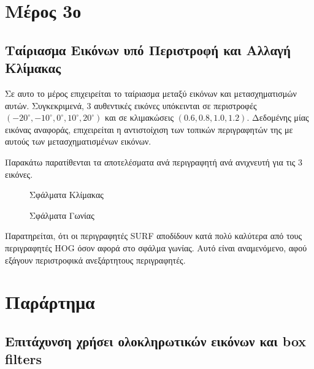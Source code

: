 \documentclass{article}
\newcommand{\eng}[1]{\foreignlanguage{english}{#1}}
\begin{document}
\section{Μέρος 3ο}

\subsection{Ταίριασμα Εικόνων υπό Περιστροφή και Αλλαγή Κλίμακας}

Σε αυτο το μέρος επιχειρείται το ταίριασμα μεταξύ εικόνων και μετασχηματισμών αυτών. Συγκεκριμενά, 3 αυθεντικές εικόνες υπόκεινται σε περιστροφές $(-20^{\circ}, -10^{\circ}, 0^{\circ}, 10^{\circ}, 20^{\circ})$ και σε κλιμακώσεις  $(0.6, 0.8, 1.0, 1.2)$. Δεδομένης μίας εικόνας αναφοράς, επιχειρείται η αντιστοίχιση των τοπικών περιγραφητών της με αυτούς των μετασχηματισμένων εικόνων.

Παρακάτω παρατίθενται τα αποτελέσματα ανά περιγραφητή ανά ανιχνευτή για τις 3 εικόνες.

\begin{figure}[h]
    
    \caption{Σφάλματα Κλίμακας}
\end{figure}

\begin{figure}[h]
    
    \caption{Σφάλματα Γωνίας}
\end{figure}

Παρατηρείται, ότι οι περιγραφητές \eng{SURF} αποδίδουν κατά πολύ καλύτερα από τους περιγραφητές \eng{HOG} όσον αφορά στο σφάλμα γωνίας. Αυτό είναι αναμενόμενο, αφού εξάγουν περιστροφικά ανεξάρτητους περιγραφητές.



\newpage
\section{Παράρτημα}
\subsection{Επιτάχυνση χρήσει ολοκληρωτικών εικόνων και \eng{box filters}}
\label{section:details}
\end{document}
